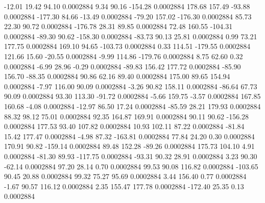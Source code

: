       -12.01       19.42       94.10     0.0002884
        9.34       90.16     -154.28     0.0002884
      178.68      157.49      -93.88     0.0002884
     -177.30       84.66      -13.49     0.0002884
      -79.20      157.02     -176.30     0.0002884
       85.73       22.30       90.72     0.0002884
     -176.78       28.31       89.85     0.0002884
       72.48      160.55     -104.31     0.0002884
      -89.30       90.62     -158.30     0.0002884
      -83.73       90.13       25.81     0.0002884
        0.99       73.21      177.75     0.0002884
      169.10       94.65     -103.73     0.0002884
        0.33      114.51     -179.55     0.0002884
      121.66       15.60      -20.55     0.0002884
       -9.99      114.86     -179.76     0.0002884
        8.75       62.60        0.32     0.0002884
       -6.99       28.96       -0.29     0.0002884
      -89.83      156.42      177.72     0.0002884
      -85.90      156.70      -88.35     0.0002884
       90.86       62.16       89.40     0.0002884
      175.00       89.65      154.94     0.0002884
       -7.97      116.00       90.09     0.0002884
       -3.26       90.82      158.11     0.0002884
      -86.64       67.73       90.09     0.0002884
       93.30      113.30      -91.72     0.0002884
       -5.66      159.75       -3.57     0.0002884
      167.85      160.68       -4.08     0.0002884
      -12.97       86.50       17.24     0.0002884
      -85.59       28.21      179.93     0.0002884
       88.32       98.12       75.01     0.0002884
       92.35      164.87      169.91     0.0002884
       90.11       90.62     -156.28     0.0002884
      177.53       93.40      107.82     0.0002884
       10.93      102.11       87.22     0.0002884
      -81.84       15.42      177.47     0.0002884
       -4.98       87.32     -163.81     0.0002884
       77.84       24.20        0.30     0.0002884
      170.91       90.82     -159.14     0.0002884
       89.48      152.28      -89.26     0.0002884
      175.73      104.10        4.91     0.0002884
      -81.30       89.93     -117.75     0.0002884
      -93.31       90.32       28.91     0.0002884
        3.23       90.30      -62.14     0.0002884
       97.20       28.14        0.70     0.0002884
       99.53       90.08      116.82     0.0002884
     -103.65       90.45       20.88     0.0002884
       99.32       75.27       95.69     0.0002884
        3.44      156.40        0.77     0.0002884
       -1.67       90.57      116.12     0.0002884
        2.35      155.47      177.78     0.0002884
     -172.40       25.35        0.13     0.0002884
